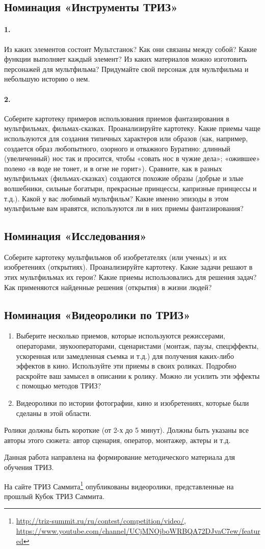 \documentclass[11pt,a4paper]{article}
\newcommand{\video}{Ролики должны быть короткие (от 2-х до 5 минут). Должны
  быть указаны все авторы этого сюжета: автор сценария, оператор, монтажер,
  актеры и т.д.

Данная работа направлена на формирование методического материала для обучения
ТРИЗ.

На сайте ТРИЗ
Саммита\footnote{\url{http://triz-summit.ru/ru/contest/competition/video/},\\
  \url{https://www.youtube.com/channel/UCjMNOjboWRBQA72DJvaC7ew/featured}}
опубликованы видеоролики, представленные на прошлый Кубок ТРИЗ Саммита.}
\begin{document}
\subsection*{Номинация «Инструменты ТРИЗ»}

\paragraph{1.}
Из каких элементов состоит Мультстанок? Как они связаны между собой? Какие
функции выполняет каждый элемент? Из каких материалов можно изготовить
персонажей для мультфильма? Придумайте свой персонаж для мультфильма и
небольшую историю о нем.

\paragraph{2.}
Соберите картотеку примеров использования приемов фантазирования в
мультфильмах, фильмах-сказках. Проанализируйте картотеку. Какие приемы чаще
используются для создания типичных характеров или образов (как, например,
создается образ любопытного, озорного и отважного Буратино: длинный
(увеличенный) нос так и просится, чтобы «совать нос в чужие дела»; «ожившее»
полено «в воде не тонет, и в огне не горит»). Сравните, как в разных
мультфильмах (фильмах-сказках) создаются похожие образы (добрые и злые
волшебники, сильные богатыри, прекрасные принцессы, капризные принцессы и
т.д.). Какой у вас любимый мультфильм? Какие именно эпизоды в этом
мультфильме вам нравятся, используются ли в них приемы фантазирования?

\subsection*{Номинация «Исследования»}
Соберите картотеку мультфильмов об изобретателях (или ученых) и их
изобретениях (открытиях). Проанализируйте картотеку. Какие задачи решают в
этих мультфильмах их герои? Какие приемы использовались для решения задач? Как
применяются найденные решения (открытия) в жизни людей?

\subsection*{Номинация «Видеоролики по ТРИЗ»}
\begin{enumerate}\itemsep0pt
\item Выберите несколько приемов, которые используются режиссерами,
  операторами, звукооператорами, сценаристами (монтаж, паузы, спецэффекты,
  ускоренная или замедленная съемка и т.д.) для получения каких-либо эффектов
  в кино. Используйте эти приемы в своих роликах. Подробно раскройте ваш
  замысел в описании к ролику. Можно ли усилить эти эффекты с помощью методов
  ТРИЗ?
\item Видеоролики по истории фотографии, кино и изобретениях, которые были
  сделаны в этой области.
\end{enumerate}
\enlargethispage{5em}
\video
\end{document}
